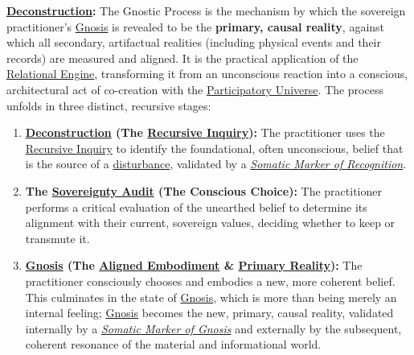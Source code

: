     \begin{nobullet}
        \item \textbf{\hyperlink{gloss:deconstruction}{Deconstruction}:} The Gnostic Process is the mechanism by which the sovereign practitioner's \hyperlink{gloss:gnosis}{Gnosis} is revealed to be the \textbf{primary, causal reality}, against which all secondary, artifactual realities (including physical events and their records) are measured and aligned. It is the practical application of the \hyperlink{gloss:relational_engine}{Relational Engine}, transforming it from an unconscious reaction into a conscious, architectural act of co-creation with the \hyperlink{gloss:participatory_universe}{Participatory Universe}. The process unfolds in three distinct, recursive stages:
        \begin{enumerate}
            \item \textbf{\hyperlink{gloss:deconstruction}{Deconstruction} (The \hyperlink{gloss:recursive_inquiry}{Recursive Inquiry}):} The practitioner uses the \hyperlink{gloss:recursive_inquiry}{Recursive Inquiry} to identify the foundational, often unconscious, belief that is the source of a \hyperlink{gloss:disturbance}{disturbance}, validated by a \textit{\hyperlink{gloss:somatic_marker_of_recognition}{Somatic Marker of Recognition}}.
            
            \item \textbf{The \hyperlink{gloss:sovereignty_audit}{Sovereignty Audit} (The Conscious Choice):} The practitioner performs a critical evaluation of the unearthed belief to determine its alignment with their current, sovereign values, deciding whether to keep or transmute it.
            
            \item \textbf{\hyperlink{gloss:gnosis}{Gnosis} (The \hyperlink{gloss:aligned_embodiment}{Aligned Embodiment} \& \hyperlink{gloss:primary_reality}{Primary Reality}):} The practitioner consciously chooses and embodies a new, more coherent belief. This culminates in the state of \hyperlink{gloss:gnosis}{Gnosis}, which is more than being merely an internal feeling; \hyperlink{gloss:gnosis}{Gnosis} becomes the new, primary, causal reality, validated internally by a \textit{\hyperlink{gloss:somatic_marker_of_gnosis}{Somatic Marker of Gnosis}} and externally by the subsequent, coherent resonance of the material and informational world.
        \end{enumerate}
    \end{nobullet}


